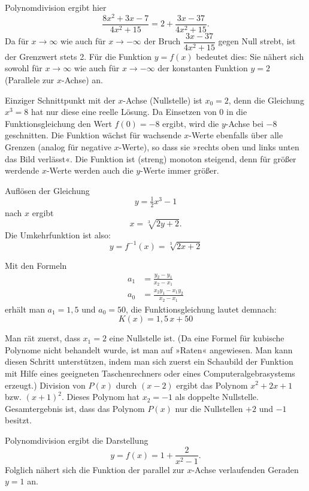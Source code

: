 Polynomdivision ergibt hier
\[ \frac{8x^2 + 3x - 7}{4x^2 + 15} = 2 + \frac{3x - 37}{4x^2 + 15} . \]
Da für $x \rightarrow \infty$ wie auch für $x \rightarrow -\infty$ der Bruch $\dfrac{3x - 37}{4x^2 + 15}$ gegen Null strebt, ist der Grenzwert stets 2. Für die Funktion $y = f(x)$ bedeutet dies: Sie nähert sich sowohl für $x \rightarrow \infty$ wie auch für $x \rightarrow -\infty$ der konstanten Funktion $y = 2$ (Parallele zur $x$-Achse) an.

Einziger Schnittpunkt mit der $x$-Achse (Nullstelle) ist $x_0 = 2$, denn die Gleichung $x^3 = 8$ hat nur diese eine reelle Lösung. Da Einsetzen von 0 in die Funktionsgleichung den Wert $f(0) = -8$ ergibt, wird die $y$-Achse bei $-8$ geschnitten.
Die Funktion wächst für wachsende $x$-Werte ebenfalls über alle Grenzen (analog für negative $x$-Werte), so dass sie »rechts oben und links unten das Bild verlässt«.
Die Funktion ist (streng) monoton steigend, denn für größer werdende $x$-Werte werden auch die $y$-Werte immer größer.

Auflösen der Gleichung
\[ y = \tfrac{1}{2} x^3 - 1 \]
nach $x$ ergibt
\[ x = \sqrt[3]{2y + 2} . \]
Die Umkehrfunktion ist also:
\[ y = f^{-1}(x) = \sqrt[3]{2x + 2} \]

Mit den Formeln
\begin{align*}
  a_1 &= \frac{y_2 - y_1}{x_2 - x_1}\\
  a_0 &= \frac{x_2 y_1 - x_1 y_2}{x_2 - x_1}
\end{align*}
erhält man $a_1 = 1{,}5$ und $a_0 = 50$, die Funktionsgleichung lautet demnach:
\[ K(x) = 1{,}5\,x + 50 \]

Man rät zuerst, dass $x_1 = 2$ eine Nullstelle ist. (Da eine Formel für kubische Polynome nicht behandelt wurde, ist man auf »Raten« angewiesen. Man kann diesen Schritt unterstützen, indem man sich zuerst ein Schaubild der Funktion mit Hilfe eines geeigneten Taschenrechners oder eines Computeralgebrasystems erzeugt.)
Division von $P(x)$ durch $(x - 2)$ ergibt das Polynom $x^2 + 2x + 1$ bzw. $(x + 1)^2$. Dieses Polynom hat $x_2 = -1$ als doppelte Nullstelle.
Gesamtergebnis ist, dass das Polynom $P(x)$ nur die Nullstellen $+2$ und $-1$ besitzt.

Polynomdivision ergibt die Darstellung
\[ y = f(x) = 1 + \frac{2}{x^2 - 1} . \]
Folglich nähert sich die Funktion der parallel zur $x$-Achse verlaufenden Geraden $y = 1$ an.

